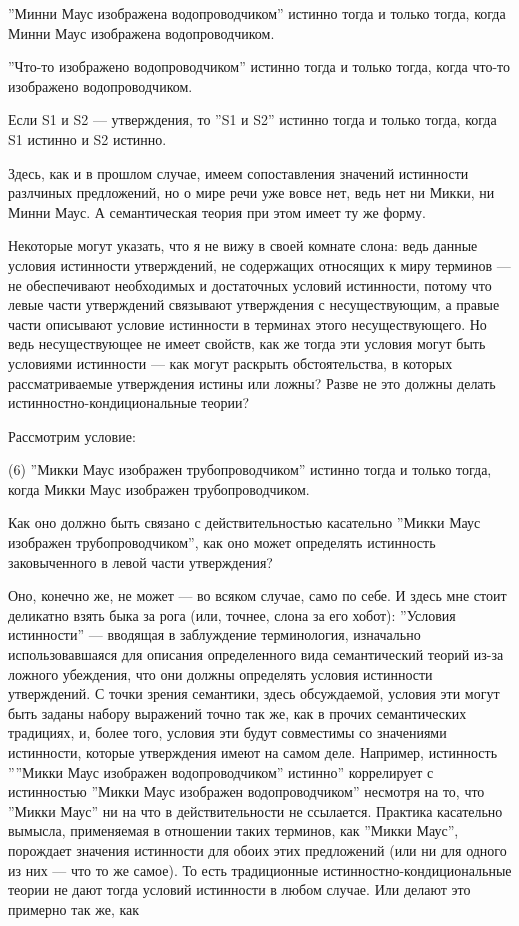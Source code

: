 \documentclass[11pt]{book}
\begin{document}
\smallskip

''Минни Маус изображена водопроводчиком'' истинно тогда и только тогда, когда Минни Маус изображена водопроводчиком.

''Что-то изображено водопроводчиком'' истинно тогда и только тогда, когда что-то изображено водопроводчиком.

Если S1 и S2 --- утверждения, то ''S1 и S2'' истинно тогда и только тогда, когда S1 истинно и S2 истинно.

\smallskip

Здесь, как и в прошлом случае, имеем сопоставления значений истинности разлчиных предложений, но о мире речи уже вовсе нет, ведь нет ни Микки, ни Минни Маус. А семантическая теория при этом имеет ту же форму.

Некоторые могут указать, что я не вижу в своей комнате слона: ведь данные условия истинности утверждений, не содержащих относящих к миру терминов --- не обеспечивают необходимых и достаточных условий истинности, потому что левые части утверждений связывают утверждения с несуществующим, а правые части описывают условие истинности в терминах этого несуществующего. Но ведь несуществующее не имеет свойств, как же тогда эти условия могут быть условиями истинности --- как могут раскрыть обстоятельства, в которых рассматриваемые утверждения истины или ложны? Разве не это должны делать истинностно-кондициональные теории?

Рассмотрим условие:

\smallskip

(6) ''Микки Маус изображен трубопроводчиком'' истинно тогда и только тогда, когда Микки Маус изображен трубопроводчиком.

\smallskip

Как оно должно быть связано с действительностью касательно ''Микки Маус изображен трубопроводчиком'', как оно может определять истинность заковыченного в левой части утверждения?

Оно, конечно же, не может --- во всяком случае, само по себе. И здесь мне стоит деликатно взять быка за рога (или, точнее, слона за его хобот): ''Условия истинности'' --- вводящая в заблуждение терминология, изначально использовавшаяся для описания определенного вида семантический теорий из-за ложного убеждения, что они должны определять условия истинности утверждений. С точки зрения семантики, здесь обсуждаемой, условия эти могут быть заданы набору выражений точно так же, как в прочих семантических традициях, и, более того, условия эти будут совместимы со значениями истинности, которые утверждения имеют на самом деле. Например, истинность ''''Микки Маус изображен водопроводчиком'' истинно'' коррелирует с истинностью ''Микки Маус изображен водопроводчиком'' несмотря на то, что ''Микки Маус'' ни на что в действительности не ссылается. Практика касательно вымысла, применяемая в отношении таких терминов, как ''Микки Маус'', порождает значения истинности для обоих этих предложений (или ни для одного из них --- что то же самое). То есть традиционные истинностно-кондициональные теории не дают тогда условий истинности в любом случае. Или делают это примерно так же, как
\end{document}
